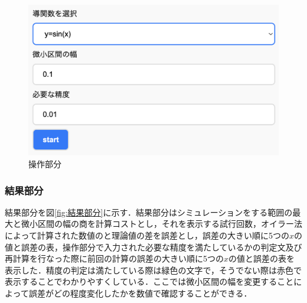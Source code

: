 \documentclass[a4paper, 12pt]{ltjsarticle}
\begin{document}
\begin{figure}[h]
\begin{center}
\includegraphics[clip,width=\textwidth,keepaspectratio]{sim-sousa.png}
\end{center}
\caption{操作部分}
\label{fig:操作部分}
\end{figure}

\subsubsection{結果部分}
結果部分を図\ref{fig:結果部分}に示す．結果部分はシミュレーションをする範囲の最大と微小区間の幅の商を計算コストとし，それを表示する試行回数，オイラー法によって計算された数値のと理論値の差を誤差とし，誤差の大きい順に5つの$x$の値と誤差の表，操作部分で入力された必要な精度を満たしているかの判定文及び再計算を行なった際に前回の計算の誤差の大きい順に5つの$x$の値と誤差の表を表示した．精度の判定は満たしている際は緑色の文字で，そうでない際は赤色で表示することでわかりやすくしている．ここでは微小区間の幅を変更することによって誤差がどの程度変化したかを数値で確認することができる．
\end{document}
